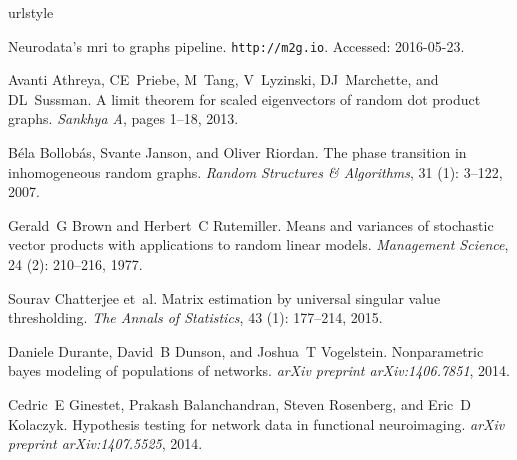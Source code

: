 \documentclass[10pt,letterpaper]{article}
\begin{document}
%
%
% 
\begin{thebibliography}{10}
\providecommand{\natexlab}[1]{#1}
\providecommand{\url}[1]{\texttt{#1}}
\expandafter\ifx\csname urlstyle\endcsname\relax
  \providecommand{\doi}[1]{doi: #1}\else
  \providecommand{\doi}{doi: \begingroup \urlstyle{rm}\Url}\fi

Neurodata’s mri to graphs pipeline.
\newblock \url{http://m2g.io}.
\newblock Accessed: 2016-05-23.

Avanti Athreya, CE~Priebe, M~Tang, V~Lyzinski, DJ~Marchette, and DL~Sussman.
\newblock A limit theorem for scaled eigenvectors of random dot product graphs.
\newblock \emph{Sankhya A}, pages 1--18, 2013.

B{\'e}la Bollob{\'a}s, Svante Janson, and Oliver Riordan.
\newblock The phase transition in inhomogeneous random graphs.
\newblock \emph{Random Structures \& Algorithms}, 31 (1):
  3--122, 2007.

Gerald~G Brown and Herbert~C Rutemiller.
\newblock Means and variances of stochastic vector products with applications
  to random linear models.
\newblock \emph{Management Science}, 24 (2): 210--216, 1977.

Sourav Chatterjee et~al.
\newblock Matrix estimation by universal singular value thresholding.
\newblock \emph{The Annals of Statistics}, 43 (1): 177--214,
  2015.

Daniele Durante, David~B Dunson, and Joshua~T Vogelstein.
\newblock Nonparametric bayes modeling of populations of networks.
\newblock \emph{arXiv preprint arXiv:1406.7851}, 2014.

Cedric~E Ginestet, Prakash Balanchandran, Steven Rosenberg, and Eric~D
  Kolaczyk.
\newblock Hypothesis testing for network data in functional neuroimaging.
\newblock \emph{arXiv preprint arXiv:1407.5525}, 2014.


\end{thebibliography}
\end{document}
